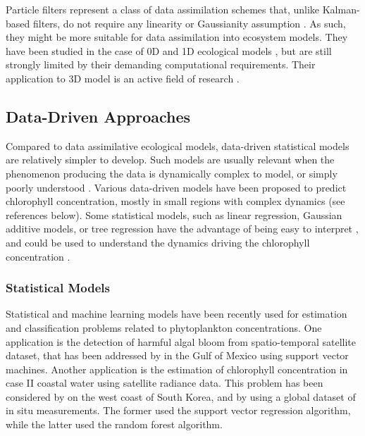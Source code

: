Particle filters represent a class of data assimilation schemes that, unlike
Kalman-based filters, do not require any linearity or Gaussianity assumption
\citep{Edwards2015}. As such, they might be more suitable for data assimilation
into ecosystem models. They have been studied in the case of 0D and 1D
ecological models \citep{Edwards2015}, but are still strongly limited by their
demanding computational requirements. Their application to 3D model is an
active field of research \citep{Edwards2015}.


\subsection{Data-Driven Approaches}

Compared to data assimilative ecological models, data-driven statistical models
are relatively simpler to develop. Such models are usually
relevant when the phenomenon
producing the data is dynamically complex to model, or simply poorly understood
\citep{Gareth2013}. Various data-driven models have been proposed
to predict chlorophyll
concentration, mostly in small regions with complex dynamics (see references
below). Some statistical models, such as linear regression, Gaussian additive
models, or tree regression have the advantage of being easy to interpret
\citep{Gareth2013}, and could be used to understand the dynamics driving the
chlorophyll concentration \citep{Raitsos2012}.

\subsubsection{Statistical Models}

Statistical and machine learning models have been recently used for estimation and
classification problems related to phytoplankton concentrations. One
application is the detection of harmful algal bloom from spatio-temporal
satellite dataset, that has been addressed by \citet{Gokaraju2011} in the Gulf
of Mexico using support vector machines. Another application is the estimation
of chlorophyll concentration in case II coastal water using satellite radiance
data. This problem has been considered by \citet{Kim2014} on the west coast of
South Korea, and by \citet{Camps-Valls2006} using a global dataset of in situ
measurements.  The former used the support vector regression algorithm, while
the latter used the random forest algorithm.

